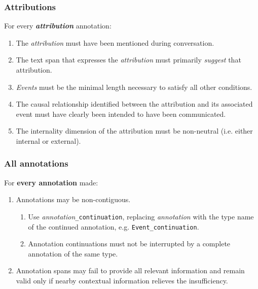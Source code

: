 \documentclass[a4paper,12pt]{article}
\begin{document}
    \subsubsection{Attributions}
    For every \textbf{\emph{attribution}} annotation:
        \begin{enumerate}
            \item The \emph{attribution} must have been mentioned during conversation.
            \item The text span that expresses the \emph{attribution} must primarily \emph{suggest} that attribution. %
            \item \emph{Events} must be the minimal length necessary to satisfy all other conditions.
            \item The causal relationship identified between the attribution and its associated event must have clearly been intended to have been communicated.
            \item The internality dimension of the attribution must be non-neutral (i.e. either internal or external).
        \end{enumerate}


    \subsubsection{All annotations}
    For \textbf{every annotation} made:
        \begin{enumerate}
            \item Annotations may be non-contiguous.
                \begin{enumerate}
                    \item Use \emph{annotation}\texttt{\_continuation}, replacing \emph{annotation} with the type name of the continued annotation, e.g. \texttt{Event\_continuation}.
                    \item Annotation continuations must not be interrupted by a complete annotation of the same type.
                \end{enumerate}
            \item Annotation spans may fail to provide all relevant information and remain valid only if nearby contextual information relieves the insufficiency.
        \end{enumerate}
\end{document}
